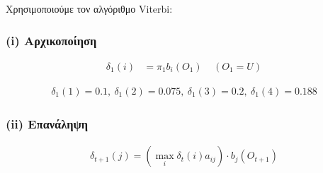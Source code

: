 \documentclass[12pt,a4paper]{article}
\begin{document}
			Χρησιμοποιούμε τον αλγόριθμο Viterbi:
			
			\subsubsection*{(i) Αρχικοποίηση}
				\begin{align*}
					\delta_1\left(i\right) &= \pi_1 b_i\left(O_1\right)  ~~~~~\left(O_1 = U\right)
				\end{align*}
				
				\begin{align*}
					\delta_1\left(1\right) = 0.1, ~
					\delta_1\left(2\right) = 0.075, ~
					\boxed{\delta_1\left(3\right) = 0.2}, ~
					\delta_1\left(4\right) = 0.188   
				\end{align*}
				
			\subsubsection*{(ii) Επανάληψη} 
				\begin{align*}
					\delta_{t+1}\left(j\right) = \left(\max_{i}\delta_t\left(i\right)a_{ij}\right)\cdot b_j\left(O_{t+1}\right)
				\end{align*}
			
\end{document}

